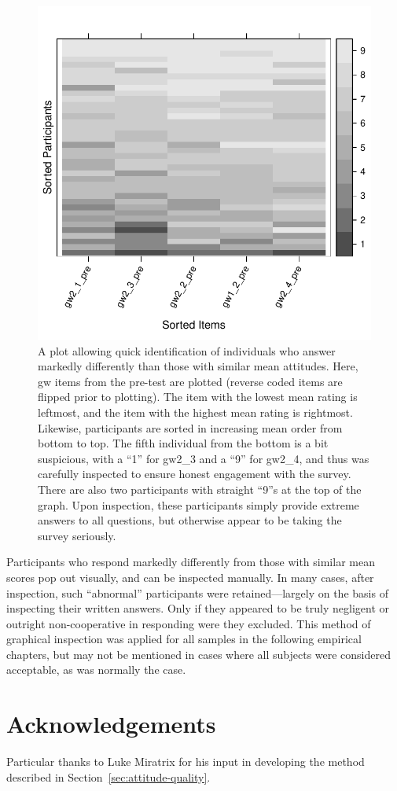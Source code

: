 \begin{figure}
    \begin{center}
        \includegraphics{consistency.pdf}
    \end{center}
    \caption{A plot allowing quick identification of individuals who answer
        markedly differently than those with similar mean attitudes. Here,
        \textsf{gw} items from the pre-test are plotted (reverse coded items are
        flipped prior to plotting). The item with the lowest mean rating is
        leftmost, and the item with the highest mean rating is rightmost.
        Likewise, participants are sorted in increasing mean order from bottom
        to top. The fifth individual from the bottom is a bit suspicious, with a
        “1” for \textsf{gw2_3} and a “9” for \textsf{gw2_4}, and thus was
        carefully inspected to ensure honest engagement with the survey. There
        are also two participants with straight “9”s at the top of the graph.
        Upon inspection, these participants simply provide extreme answers to
        all questions, but otherwise appear to be taking the survey seriously.}
    \label{fig:consistency}
\end{figure}

Participants who respond markedly differently from those with similar mean
scores pop out visually, and can be inspected manually. In many cases, after
inspection, such “abnormal” participants were retained---largely on the basis of
inspecting their written answers. Only if they appeared to be truly negligent or
outright non-cooperative in responding were they excluded. This method of
graphical inspection was applied for all samples in the following empirical
chapters, but may not be mentioned in cases where all subjects were considered
acceptable, as was normally the case.


\section*{Acknowledgements}

Particular thanks to Luke Miratrix for his input in developing the method
described in Section~\ref{sec:attitude-quality}.
